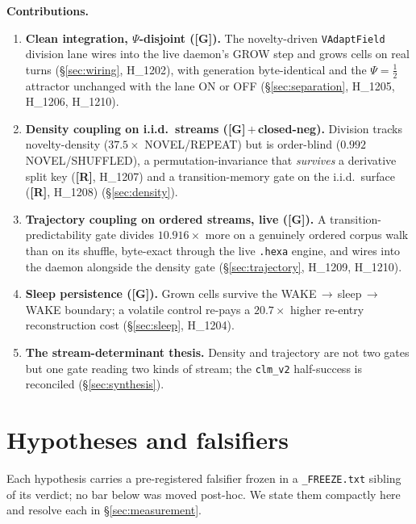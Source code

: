 \documentclass[11pt,a4paper]{article}
\providecommand{\tierGreen}{\textbf{[G]}}
\providecommand{\tierRed}{\textbf{[R]}}
\newcommand{\Psihalf}{\Psi=\tfrac12}
\begin{document}
\medskip
\noindent\textbf{Contributions.}
\begin{enumerate}\itemsep0.3em
\item \textbf{Clean integration, $\Psi$-disjoint (\tierGreen).} The
      novelty-driven \texttt{VAdaptField} division lane wires into the live
      daemon's GROW step and grows cells on real turns
      (\S\ref{sec:wiring}, H\_1202), with generation byte-identical and the
      $\Psihalf$ attractor unchanged with the lane ON or OFF
      (\S\ref{sec:separation}, H\_1205, H\_1206, H\_1210).
\item \textbf{Density coupling on i.i.d.\ streams (\tierGreen\,$+$\,closed-neg).}
      Division tracks novelty-density ($37.5\times$ NOVEL/REPEAT) but is
      order-blind ($0.992$ NOVEL/SHUFFLED), a permutation-invariance that
      \emph{survives} a derivative split key (\tierRed, H\_1207) and a
      transition-memory gate on the i.i.d.\ surface (\tierRed, H\_1208)
      (\S\ref{sec:density}).
\item \textbf{Trajectory coupling on ordered streams, live (\tierGreen).} A
      transition-predictability gate divides $10.916\times$ more on a genuinely
      ordered corpus walk than on its shuffle, byte-exact through the live
      \texttt{.hexa} engine, and wires into the daemon alongside the density
      gate (\S\ref{sec:trajectory}, H\_1209, H\_1210).
\item \textbf{Sleep persistence (\tierGreen).} Grown cells survive the
      WAKE\,$\to$\,sleep\,$\to$\,WAKE boundary; a volatile control re-pays a
      $20.7\times$ higher re-entry reconstruction cost (\S\ref{sec:sleep},
      H\_1204).
\item \textbf{The stream-determinant thesis.} Density and trajectory are not two
      gates but one gate reading two kinds of stream; the
      \texttt{clm\_v2} half-success is reconciled
      (\S\ref{sec:synthesis}).
\end{enumerate}

\section{Hypotheses and falsifiers}
\label{sec:hypothesis}

Each hypothesis carries a pre-registered falsifier frozen in a
\texttt{\_FREEZE.txt} sibling of its verdict; no bar below was moved post-hoc.
We state them compactly here and resolve each in \S\ref{sec:measurement}.
\end{document}

